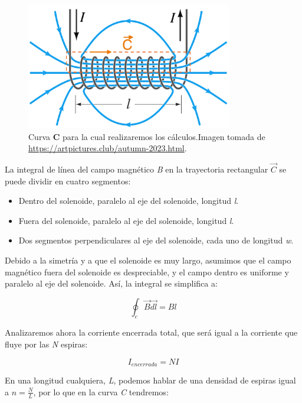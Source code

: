 \begin{figure}[H]
    \centering %
    \includegraphics[width=9cm]{FigurasMemoria/integralampere.png}
    \caption{Curva \textbf{C} para la cual realizaremos los cálculos.Imagen tomada de \href{URL}{https://artpictures.club/autumn-2023.html}.}
    \label{fig:integralampere} %
\end{figure}

La integral de línea del campo magnético \textit{B} en la trayectoria rectangular \(\vec C\) se puede dividir en cuatro segmentos:
\begin{itemize}
    \item Dentro del solenoide, paralelo al eje del solenoide, longitud \textit{l}.
    \item Fuera del solenoide, paralelo al eje del solenoide, longitud \textit{l}.
    \item Dos segmentos perpendiculares al eje del solenoide, cada uno de longitud \textit{w}.
\end{itemize}

Debido a la simetría y a que el solenoide es muy largo, asumimos que el campo magnético fuera del solenoide es despreciable, y el campo dentro es uniforme y paralelo al eje del solenoide. Así, la integral se simplifica a:

\begin{center}
    \[\oint_c\vec{B} \vec{dl}=Bl\]
\end{center}

Analizaremos ahora la corriente encerrada total, que será igual a la corriente que fluye por las \textit{N} espiras:

\begin{center}
    \[I_{encerrada} = NI\]
\end{center}

En una longitud cualquiera, \textit{L}, podemos hablar de una densidad de espiras igual a \(n=\frac{N}{L}\), por lo que en la curva \textit{C} tendremos:

